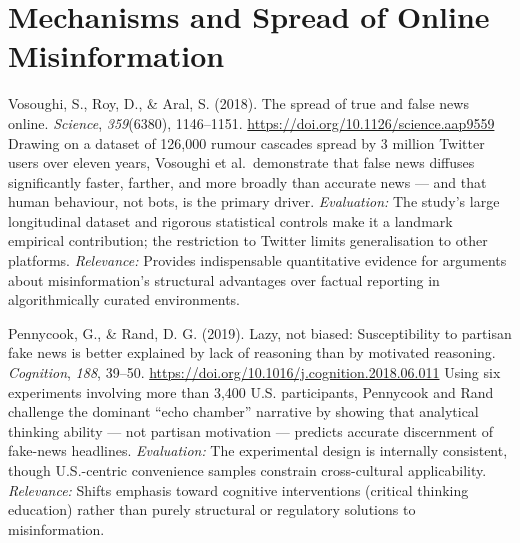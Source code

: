 \section{Mechanisms and Spread of Online Misinformation}

\bibentry
  {Vosoughi, S., Roy, D., \& Aral, S. (2018). The spread of true and false news online.
   \textit{Science}, \textit{359}(6380), 1146–1151.
   \href{https://doi.org/10.1126/science.aap9559}{https://doi.org/10.1126/science.aap9559}}
  {Drawing on a dataset of 126,000 rumour cascades spread by 3 million Twitter users over eleven
   years, Vosoughi et al.\ demonstrate that false news diffuses significantly faster, farther, and
   more broadly than accurate news — and that human behaviour, not bots, is the primary driver.
   \textit{Evaluation:} The study's large longitudinal dataset and rigorous statistical controls
   make it a landmark empirical contribution; the restriction to Twitter limits generalisation to
   other platforms. \textit{Relevance:} Provides indispensable quantitative evidence for arguments
   about misinformation's structural advantages over factual reporting in algorithmically curated
   environments.}

\bibentry
  {Pennycook, G., \& Rand, D. G. (2019). Lazy, not biased: Susceptibility to partisan fake news
   is better explained by lack of reasoning than by motivated reasoning.
   \textit{Cognition}, \textit{188}, 39–50.
   \href{https://doi.org/10.1016/j.cognition.2018.06.011}{https://doi.org/10.1016/j.cognition.2018.06.011}}
  {Using six experiments involving more than 3,400 U.S. participants, Pennycook and Rand challenge
   the dominant ``echo chamber'' narrative by showing that analytical thinking ability — not
   partisan motivation — predicts accurate discernment of fake-news headlines. \textit{Evaluation:}
   The experimental design is internally consistent, though U.S.-centric convenience samples
   constrain cross-cultural applicability. \textit{Relevance:} Shifts emphasis toward cognitive
   interventions (critical thinking education) rather than purely structural or regulatory solutions
   to misinformation.}


